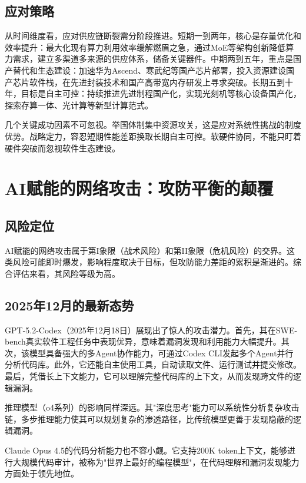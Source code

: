 \subsection{应对策略}

从时间维度看，应对供应链断裂需分阶段推进。短期一到两年，核心是存量优化和效率提升：最大化现有算力利用效率缓解燃眉之急，通过MoE等架构创新降低算力需求，建立多渠道多来源的供应体系，储备关键器件。中期两到五年，重点是国产替代和生态建设：加速华为Ascend、寒武纪等国产芯片部署，投入资源建设国产芯片软件栈，在先进封装技术和国产高带宽内存研发上寻求突破。长期五到十年，目标是自主可控：持续推进先进制程国产化，实现光刻机等核心设备国产化，探索存算一体、光计算等新型计算范式。

几个关键成功因素不可忽视。举国体制集中资源攻关，这是应对系统性挑战的制度优势。战略定力，容忍短期性能差距换取长期自主可控。软硬件协同，不能只盯着硬件突破而忽视软件生态建设。

\section{AI赋能的网络攻击：攻防平衡的颠覆}

\subsection{风险定位}

AI赋能的网络攻击属于第I象限（战术风险）和第II象限（危机风险）的交界。这类风险可能即时爆发，影响程度取决于目标，但攻防能力差距的累积是渐进的。综合评估来看，其风险等级为高。

\subsection{2025年12月的最新态势}

GPT-5.2-Codex（2025年12月18日）展现出了惊人的攻击潜力。首先，其在SWE-bench真实软件工程任务中表现优异，意味着漏洞发现和利用能力大幅提升。其次，该模型具备强大的多Agent协作能力，可通过Codex CLI发起多个Agent并行分析代码库。此外，它还能自主使用工具，自动读取文件、运行测试并提交修改。最后，凭借长上下文能力，它可以理解完整代码库的上下文，从而发现跨文件的逻辑漏洞。

推理模型（o4系列）的影响同样深远。其"深度思考"能力可以系统性分析复杂攻击链，多步推理能力使其可以规划复杂的渗透路径，比传统模型更善于发现隐蔽的逻辑漏洞。

Claude Opus 4.5的代码分析能力也不容小觑。它支持200K token上下文，能够进行大规模代码审计，被称为"世界上最好的编程模型"，在代码理解和漏洞发现能力方面处于领先地位。

